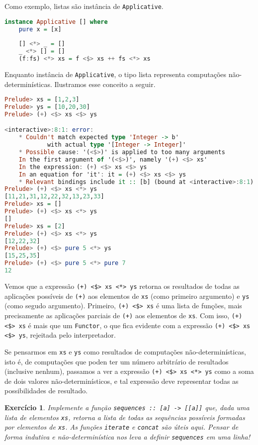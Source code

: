 \documentclass[a4paper]{article}
\newtheorem{exercicio}{Exercício}
\begin{document}
Como exemplo, listas são instância de \texttt{Applicative}.

\begin{lstlisting}[language=haskell, frame=single]
instance Applicative [] where
	pure x = [x]
	
	[] <*> _ = []
	_ <*> [] = []
	(f:fs) <*> xs = f <$> xs ++ fs <*> xs
\end{lstlisting}

Enquanto instância de \texttt{Applicative}, o tipo lista representa computações não-determinísticas.
Ilustramos esse conceito a seguir.

\pagebreak

\begin{lstlisting}[language=haskell, frame=single]
Prelude> xs = [1,2,3]
Prelude> ys = [10,20,30]
Prelude> (+) <$> xs <$> ys

<interactive>:8:1: error:
	* Couldn't match expected type 'Integer -> b'
			with actual type '[Integer -> Integer]'
	* Possible cause: '(<$>)' is applied to too many arguments
	In the first argument of '(<$>)', namely '(+) <$> xs'
	In the expression: (+) <$> xs <$> ys
	In an equation for 'it': it = (+) <$> xs <$> ys
	* Relevant bindings include it :: [b] (bound at <interactive>:8:1)
Prelude> (+) <$> xs <*> ys
[11,21,31,12,22,32,13,23,33]
Prelude> xs = []
Prelude> (+) <$> xs <*> ys
[]
Prelude> xs = [2]
Prelude> (+) <$> xs <*> ys
[12,22,32]
Prelude> (+) <$> pure 5 <*> ys
[15,25,35]
Prelude> (+) <$> pure 5 <*> pure 7
12
\end{lstlisting}

Vemos que a expressão \texttt{(+) <\$> xs <*> ys} retorna os resultados de todas as aplicações possíveis de \texttt{(+)} aos elementos de \texttt{xs} (como primeiro argumento) e \texttt{ys} (como segudo argumento).
Primeiro, \mbox{\texttt{(+) <\$> xs}} é uma lista de funções, mais precisamente as aplicações parciais de \texttt{(+)} aos elementos de \texttt{xs}.
Com isso, \mbox{\texttt{(+) <\$> xs}} é mais que um \texttt{Functor}, o que fica evidente com a expressão \texttt{(+) <\$> xs <\$> ys}, rejeitada pelo interpretador.

Se pensarmos em \texttt{xs} e \texttt{ys} como resultados de computações não-determinísticas, isto é, de computações que poden ter um número arbitrário de resultados (inclusive nenhum), passamos a ver a expressão \texttt{(+) <\$> xs <*> ys} como a soma de dois valores não-determinísticos, e tal expressão deve representar todas as possibilidades de resultado.

\begin{exercicio}
	Implemente a função \emph{\texttt{sequences :: [a] -> [[a]]}} que, dada uma lista de elementos \emph{\texttt{xs}}, retorna a lista de todas as sequências possíveis formadas por elementos de \emph{\texttt{xs}}.
	As funções \emph{\texttt{iterate}} e \emph{\texttt{concat}} são úteis aqui.
	Pensar de forma indutiva e não-determinística nos leva a definir \emph{\texttt{sequences}} em uma linha!
\end{exercicio}
\end{document}
